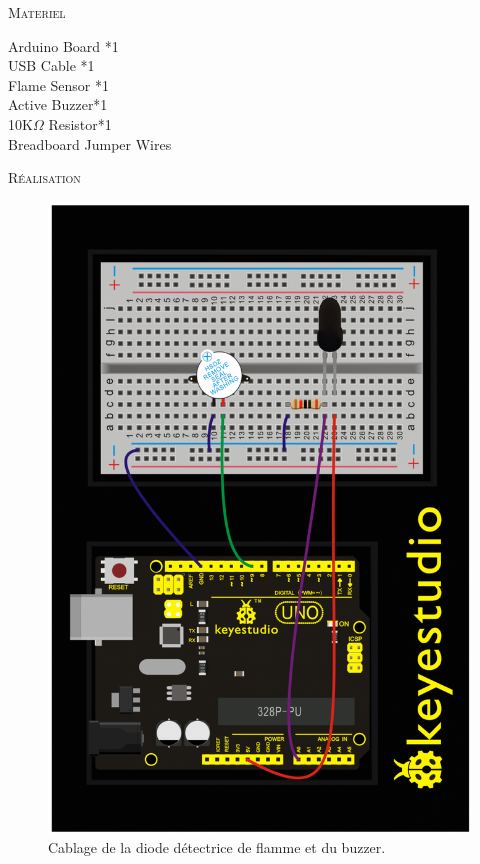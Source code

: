\documentclass[a4paper, 11pt]{article}           %
\newcommand{\partie}[1]{\textsc{\LARGE #1} }
\begin{document}
\partie{Materiel}                         %
\begin{multicols}{2}
Arduino Board *1\\
USB Cable *1\\
Flame Sensor *1 \\
Active Buzzer*1\\
10K$\Omega$ Resistor*1\\
Breadboard Jumper Wires\\
\end{multicols}


\bigskip

\partie{Réalisation} \\                      %
\begin{figure}[p]
\begin{center}
\includegraphics[height=0.9\textheight]{cablage}
\caption{Cablage de la diode détectrice de flamme et du buzzer.}
\label{FigDiodeFlamme}
\end{center}
\end{figure}
\end{document}
